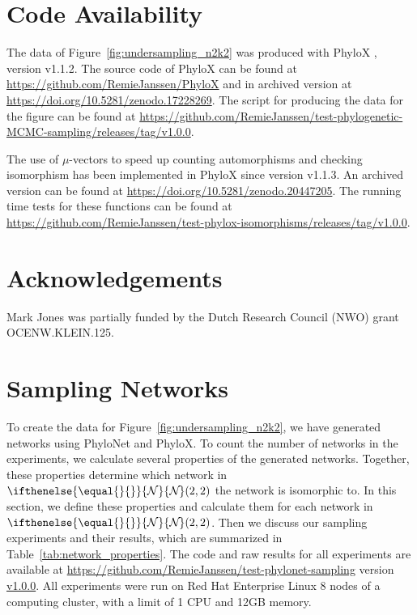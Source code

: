 \documentclass{article}
\theoremstyle{definition}
\newcommand{\N}[1][]{
\ifthenelse{\equal{#1}{}}{\mathcal{N}}{\mathcal{N}_{#1}}%
}
\begin{document}
\section{Code Availability}
The data of Figure~\ref{fig:undersampling_n2k2} was produced with PhyloX \cite{janssen2024phylox}, version v1.1.2. 
The source code of PhyloX can be found at \url{https://github.com/RemieJanssen/PhyloX} and in archived version at \url{https://doi.org/10.5281/zenodo.17228269}. 
The script for producing the data for the figure can be found at \url{https://github.com/RemieJanssen/test-phylogenetic-MCMC-sampling/releases/tag/v1.0.0}. 

The use of $\mu$-vectors to speed up counting automorphisms and checking isomorphism has been implemented in PhyloX since version v1.1.3. An archived version can be found at \url{https://doi.org/10.5281/zenodo.20447205}. The running time tests for these functions can be found at \url{https://github.com/RemieJanssen/test-phylox-isomorphisms/releases/tag/v1.0.0}.


\section*{Acknowledgements}
Mark Jones was partially funded by the Dutch Research Council (NWO) grant OCENW.KLEIN.125.





\appendix
\section{Sampling Networks}\label{sec:Appendix_Sampling}
To create the data for Figure~\ref{fig:undersampling_n2k2}, we have generated networks using PhyloNet and PhyloX.
To count the number of networks in the experiments, we calculate several properties of the generated networks.
Together, these properties determine which network in $\N(2,2)$ the network is isomorphic to.
In this section, we define these properties and calculate them for each network in $\N(2,2)$.
Then we discuss our sampling experiments and their results, which are summarized in Table~\ref{tab:network_properties}.
The code and raw results for all experiments are available at \url{https://github.com/RemieJanssen/test-phylonet-sampling} version \href{https://github.com/RemieJanssen/test-phylogenetic-MCMC-sampling/releases/tag/v1.0.0}{v1.0.0}.
All experiments were run on Red Hat Enterprise Linux 8 nodes of a computing cluster, with a limit of 1 CPU and 12GB memory.
\end{document}
